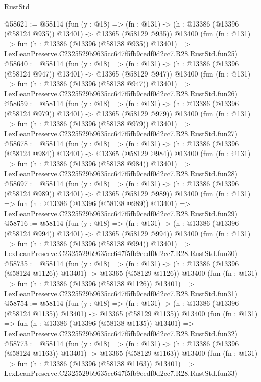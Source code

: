 \begin{lexlean}{RustStd}
\begin{coremodule}
@58621 := @58114
    (fun (y : @18) =>
    (fn : @131) -> (h : @13386 (@13396 (@58124 @935)) @13401) -> @13365 (@58129 @935))
    @13400
    (fun (fn : @131) =>
    fun (h : @13386 (@13396 (@58138 @935)) @13401) =>
    LexLeanPreserve.C2325529b9635cc647f5fb9cedf0d2cc7.R28.RustStd.fun25)
@58640 := @58114
    (fun (y : @18) =>
    (fn : @131) -> (h : @13386 (@13396 (@58124 @947)) @13401) -> @13365 (@58129 @947))
    @13400
    (fun (fn : @131) =>
    fun (h : @13386 (@13396 (@58138 @947)) @13401) =>
    LexLeanPreserve.C2325529b9635cc647f5fb9cedf0d2cc7.R28.RustStd.fun26)
@58659 := @58114
    (fun (y : @18) =>
    (fn : @131) -> (h : @13386 (@13396 (@58124 @979)) @13401) -> @13365 (@58129 @979))
    @13400
    (fun (fn : @131) =>
    fun (h : @13386 (@13396 (@58138 @979)) @13401) =>
    LexLeanPreserve.C2325529b9635cc647f5fb9cedf0d2cc7.R28.RustStd.fun27)
@58678 := @58114
    (fun (y : @18) =>
    (fn : @131) -> (h : @13386 (@13396 (@58124 @984)) @13401) -> @13365 (@58129 @984))
    @13400
    (fun (fn : @131) =>
    fun (h : @13386 (@13396 (@58138 @984)) @13401) =>
    LexLeanPreserve.C2325529b9635cc647f5fb9cedf0d2cc7.R28.RustStd.fun28)
@58697 := @58114
    (fun (y : @18) =>
    (fn : @131) -> (h : @13386 (@13396 (@58124 @989)) @13401) -> @13365 (@58129 @989))
    @13400
    (fun (fn : @131) =>
    fun (h : @13386 (@13396 (@58138 @989)) @13401) =>
    LexLeanPreserve.C2325529b9635cc647f5fb9cedf0d2cc7.R28.RustStd.fun29)
@58716 := @58114
    (fun (y : @18) =>
    (fn : @131) -> (h : @13386 (@13396 (@58124 @994)) @13401) -> @13365 (@58129 @994))
    @13400
    (fun (fn : @131) =>
    fun (h : @13386 (@13396 (@58138 @994)) @13401) =>
    LexLeanPreserve.C2325529b9635cc647f5fb9cedf0d2cc7.R28.RustStd.fun30)
@58735 := @58114
    (fun (y : @18) =>
    (fn : @131) -> (h : @13386 (@13396 (@58124 @1126)) @13401) -> @13365 (@58129 @1126))
    @13400
    (fun (fn : @131) =>
    fun (h : @13386 (@13396 (@58138 @1126)) @13401) =>
    LexLeanPreserve.C2325529b9635cc647f5fb9cedf0d2cc7.R28.RustStd.fun31)
@58754 := @58114
    (fun (y : @18) =>
    (fn : @131) -> (h : @13386 (@13396 (@58124 @1135)) @13401) -> @13365 (@58129 @1135))
    @13400
    (fun (fn : @131) =>
    fun (h : @13386 (@13396 (@58138 @1135)) @13401) =>
    LexLeanPreserve.C2325529b9635cc647f5fb9cedf0d2cc7.R28.RustStd.fun32)
@58773 := @58114
    (fun (y : @18) =>
    (fn : @131) -> (h : @13386 (@13396 (@58124 @1163)) @13401) -> @13365 (@58129 @1163))
    @13400
    (fun (fn : @131) =>
    fun (h : @13386 (@13396 (@58138 @1163)) @13401) =>
    LexLeanPreserve.C2325529b9635cc647f5fb9cedf0d2cc7.R28.RustStd.fun33)

\end{coremodule}
\end{lexlean}
